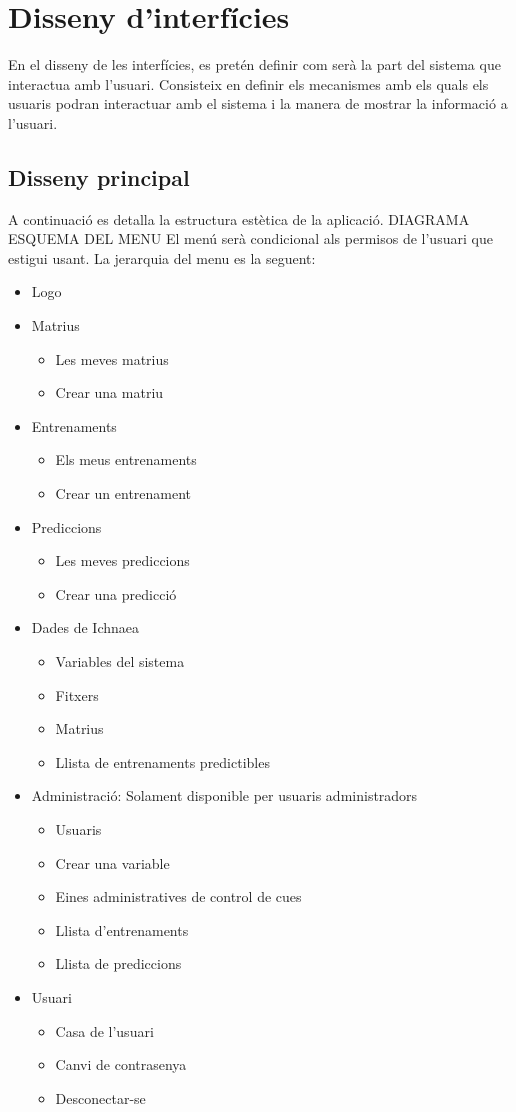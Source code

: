 \section{Disseny d'interf\'{i}cies}
\label{sec:dessigninterfaces}
En el disseny de les interfícies, es pretén definir com serà la part del sistema que interactua amb l’usuari. Consisteix en definir els mecanismes amb els quals els usuaris podran interactuar amb el sistema i la manera de mostrar la informació a l’usuari.\\
\subsection{Disseny principal}
A continuació es detalla la estructura estètica de la aplicació.
DIAGRAMA
ESQUEMA DEL MENU
El menú serà condicional als permisos de l'usuari que estigui usant. La jerarquia del menu es la seguent:
\begin{itemize}
\item Logo
\item Matrius
 \begin{itemize}
 \item Les meves matrius
 \item Crear una matriu
  \end{itemize}
\item Entrenaments
 \begin{itemize}
 \item Els meus entrenaments
 \item Crear un entrenament
 \end{itemize} 
\item Prediccions
 \begin{itemize}
 \item Les meves prediccions
 \item Crear una predicció
 \end{itemize} 
\item Dades de Ichnaea 
 \begin{itemize}
 \item Variables del sistema
 \item Fitxers
 \item Matrius
 \item Llista de entrenaments predictibles
 \end{itemize} 
\item Administració: Solament disponible per usuaris administradors
\begin{itemize}
\item Usuaris
\item Crear una variable
\item Eines administratives de control de cues
\item Llista d'entrenaments
\item Llista de prediccions
\end{itemize}
\item Usuari
 \begin{itemize}
 \item Casa de l'usuari
 \item Canvi de contrasenya
 \item Desconectar-se
 \end{itemize}
\end{itemize}

